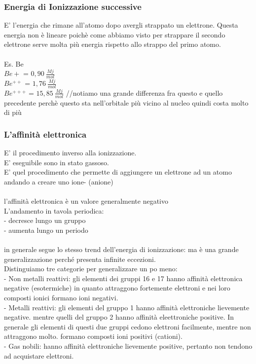 \subsubsection{Energia di Ionizzazione successive}
E’ l’energia che rimane all’atomo dopo avergli strappato un elettrone. Questa energia non è lineare poichè come abbiamo visto per strappare il secondo elettrone serve molta più energia rispetto allo strappo del primo atomo.\\\\
Es. Be\\
$Be+$ = $0,90\ \frac{Mj}{mol}$\\
$Be^{++}$ = $1,76\ \frac{Mj}{mol}$\\
$Be^{+++}$ = $15,85\ \frac{Mj}{mol}$ //notiamo una grande differenza fra questo e quello precedente perchè questo sta nell’orbitale più vicino al nucleo quindi costa molto di più
\subsubsection{L'affinità elettronica}
E’ il procedimento inverso alla ionizzazione. \\
E’ eseguibile sono in stato gassoso.\\
E’ quel procedimento che permette di aggiungere un elettrone ad un atomo andando a creare uno ione- (anione)\\\\
l’affinità elettronica è un valore generalmente negativo\\
L’andamento in tavola periodica:\\
\tab- decresce lungo un gruppo\\
\tab- aumenta lungo un periodo\\\\
in generale segue lo stesso trend dell’energia di ionizzazione: ma è una grande generalizzazione perché presenta infinite eccezioni.\\
Distinguiamo tre categorie per generalizzare un po meno:\\
\tab- Non metalli reattivi: gli elementi dei gruppi 16 e 17 hanno affinità elettronica negative (esotermiche) in quanto attraggono fortemente elettroni e nei loro composti ionici formano ioni negativi.\\
\tab- Metalli reattivi: gli elementi del gruppo 1 hanno affinità elettroniche lievemente negative. mentre quelli del gruppo 2 hanno affinità eleettroniche positive. In generale gli elementi di questi due gruppi cedono elettroni facilmente, mentre non attraggono molto. formano composti ioni positivi (cationi).\\
\tab- Gas nobili: hanno affinità elettroniche lievemente positive, pertanto non tendono ad acquistare elettroni.
